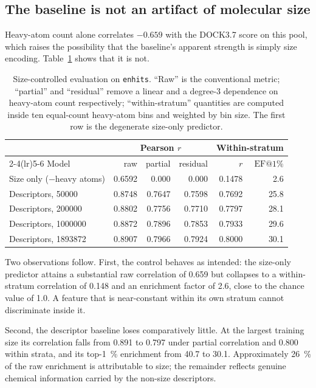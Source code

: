 \subsection{The baseline is not an artifact of molecular size}
\label{sec:results-size}

Heavy-atom count alone correlates $-0.659$ with the DOCK3.7 score on this pool,
which raises the possibility that the baseline's apparent strength is simply
size encoding. Table~\ref{tab:sizecontrol} shows that it is not.

\begin{table}[t]
\centering
\caption{Size-controlled evaluation on \texttt{enhits}. ``Raw'' is the
conventional metric; ``partial'' and ``residual'' remove a linear and a
degree-3 dependence on heavy-atom count respectively; ``within-stratum''
quantities are computed inside ten equal-count heavy-atom bins and weighted by
bin size. The first row is the degenerate size-only predictor.}
\label{tab:sizecontrol}
\small
\begin{tabular}{lrrrrr}
\toprule
 & \multicolumn{3}{c}{Pearson $r$} & \multicolumn{2}{c}{Within-stratum} \\
\cmidrule(lr){2-4}\cmidrule(lr){5-6}
Model & raw & partial & residual & $r$ & $\mathrm{EF}@1\%$ \\
\midrule
Size only ($-$heavy atoms) & 0.6592 & 0.000 & 0.000 & 0.1478 & 2.6 \\
\midrule
Descriptors, \num{50000}   & 0.8748 & 0.7647 & 0.7598 & 0.7692 & 25.8 \\
Descriptors, \num{200000}  & 0.8802 & 0.7756 & 0.7710 & 0.7797 & 28.1 \\
Descriptors, \num{1000000} & 0.8872 & 0.7896 & 0.7853 & 0.7933 & 29.6 \\
Descriptors, \num{1893872} & 0.8907 & 0.7966 & 0.7924 & 0.8000 & 30.1 \\
\bottomrule
\end{tabular}
\end{table}

Two observations follow. First, the control behaves as intended: the size-only
predictor attains a substantial raw correlation of \num{0.659} but collapses to
a within-stratum correlation of \num{0.148} and an enrichment factor of
\num{2.6}, close to the chance value of \num{1.0}. A feature that is
near-constant within its own stratum cannot discriminate inside it.

Second, the descriptor baseline loses comparatively little. At the largest
training size its correlation falls from \num{0.891} to \num{0.797} under
partial correlation and \num{0.800} within strata, and its top-\SI{1}{\percent}
enrichment from \num{40.7} to \num{30.1}. Approximately \SI{26}{\percent} of
the raw enrichment is attributable to size; the remainder reflects genuine
chemical information carried by the non-size descriptors.

